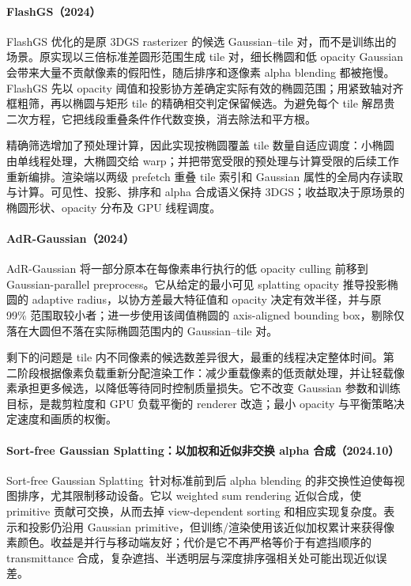 \paragraph{FlashGS（2024）\cite{2408_07967}}
FlashGS 优化的是原 3DGS rasterizer 的候选 Gaussian--tile 对，而不是训练出的场景。原实现以三倍标准差圆形范围生成 tile 对，细长椭圆和低 opacity Gaussian 会带来大量不贡献像素的假阳性，随后排序和逐像素 alpha blending 都被拖慢。FlashGS 先以 opacity 阈值和投影协方差确定实际有效的椭圆范围；用紧致轴对齐框粗筛，再以椭圆与矩形 tile 的精确相交判定保留候选。为避免每个 tile 解昂贵二次方程，它把线段重叠条件作代数变换，消去除法和平方根。

精确筛选增加了预处理计算，因此实现按椭圆覆盖 tile 数量自适应调度：小椭圆由单线程处理，大椭圆交给 warp；并把带宽受限的预处理与计算受限的后续工作重新编排。渲染端以两级 prefetch 重叠 tile 索引和 Gaussian 属性的全局内存读取与计算。可见性、投影、排序和 alpha 合成语义保持 3DGS；收益取决于原场景的椭圆形状、opacity 分布及 GPU 线程调度。

\paragraph{AdR-Gaussian（2024）\cite{2409_08669}}
AdR-Gaussian 将一部分原本在每像素串行执行的低 opacity culling 前移到 Gaussian-parallel preprocess。它从给定的最小可见 splatting opacity 推导投影椭圆的 adaptive radius，以协方差最大特征值和 opacity 决定有效半径，并与原 99\% 范围取较小者；进一步使用该阈值椭圆的 axis-aligned bounding box，剔除仅落在大圆但不落在实际椭圆范围内的 Gaussian--tile 对。

剩下的问题是 tile 内不同像素的候选数差异很大，最重的线程决定整体时间。第二阶段根据像素负载重新分配渲染工作：减少重载像素的低贡献处理，并让轻载像素承担更多候选，以降低等待同时控制质量损失。它不改变 Gaussian 参数和训练目标，是裁剪粒度和 GPU 负载平衡的 renderer 改造；最小 opacity 与平衡策略决定速度和画质的权衡。

\paragraph{Sort-free Gaussian Splatting：以加权和近似非交换 alpha 合成（2024.10）}
Sort-free Gaussian Splatting~\cite{2410_18931}针对标准前到后 alpha blending 的非交换性迫使每视图排序，尤其限制移动设备。它以 weighted sum rendering 近似合成，使 primitive 贡献可交换，从而去掉 view-dependent sorting 和相应实现复杂度。表示和投影仍沿用 Gaussian primitive，但训练/渲染使用该近似加权累计来获得像素颜色。收益是并行与移动端友好；代价是它不再严格等价于有遮挡顺序的 transmittance 合成，复杂遮挡、半透明层与深度排序强相关处可能出现近似误差。


